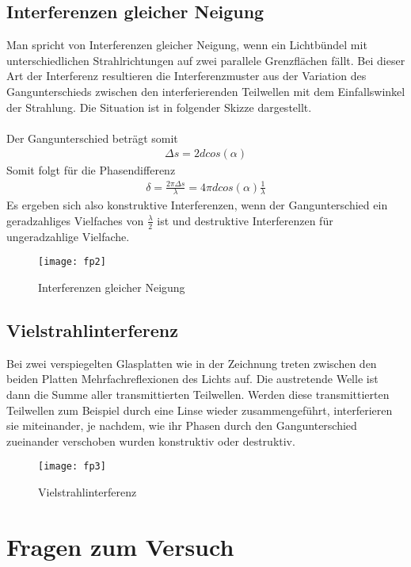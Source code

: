\documentclass[a4paper,10pt]{scrartcl}
\begin{document}
	\subsection{Interferenzen gleicher Neigung}
	Man spricht von Interferenzen gleicher Neigung, wenn ein Lichtbündel mit unterschiedlichen Strahlrichtungen
	auf zwei parallele Grenzflächen fällt. Bei dieser Art der Interferenz resultieren die Interferenzmuster aus der Variation
	des Gangunterschieds zwischen den interferierenden Teilwellen mit dem Einfallswinkel der Strahlung. Die Situation ist in folgender Skizze dargestellt.\\
	\\
	Der Gangunterschied beträgt somit
	\begin{align*}
	\Delta s=2dcos(\alpha)
	\end{align*}
	Somit folgt für die Phasendifferenz
	\begin{align*}
	\delta=\frac{2\pi \Delta s}{\lambda}=4\pi d cos(\alpha)\frac{1}{\lambda}
	\end{align*}
	Es ergeben sich also konstruktive Interferenzen, wenn der Gangunterschied ein geradzahliges Vielfaches von \(\frac{\lambda}{2}\) ist und destruktive Interferenzen für ungeradzahlige Vielfache.
	\begin{figure}[h]
\centering
\texttt{[image: fp2]}
\caption{Interferenzen gleicher Neigung}
\end{figure}
\FloatBarrier
	
	\subsection{Vielstrahlinterferenz}
	Bei zwei verspiegelten Glasplatten wie in der Zeichnung treten zwischen den beiden Platten Mehrfachreflexionen des Lichts auf. Die austretende Welle ist dann die Summe aller transmittierten Teilwellen. Werden diese transmittierten Teilwellen zum Beispiel durch eine Linse wieder zusammengeführt, interferieren sie miteinander, je nachdem, wie ihr Phasen durch den Gangunterschied zueinander verschoben wurden konstruktiv oder destruktiv.
	\begin{figure}[h]
\centering
\texttt{[image: fp3]}
\caption{Vielstrahlinterferenz}
\end{figure}
\FloatBarrier
	
	\section{Fragen zum Versuch}
\end{document}
